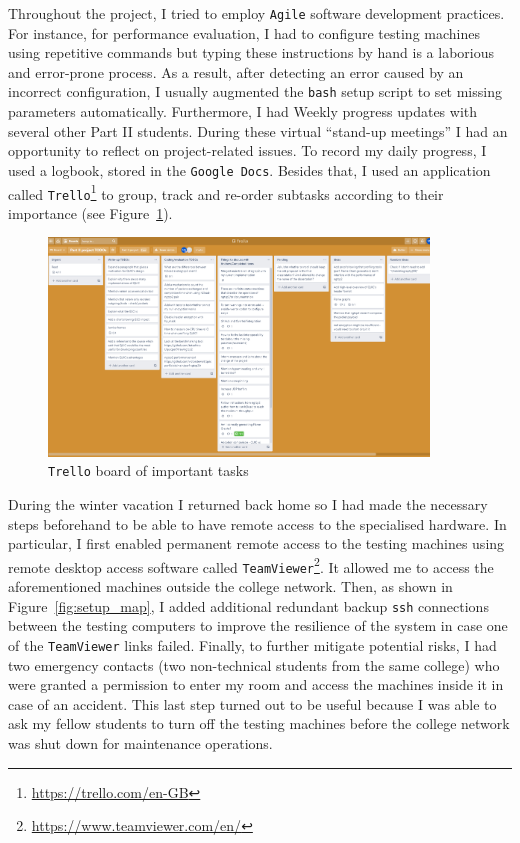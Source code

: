 \documentclass[12pt,a4paper,twoside,openright]{report}
\begin{document}
    
    Throughout the project, I tried to employ \texttt{Agile} software development practices.
    For instance, for performance evaluation, I had to configure testing machines using repetitive commands but typing these instructions by hand is a laborious and error-prone process.
    As a result, after detecting an error caused by an incorrect configuration, I usually augmented the \texttt{bash} setup script to set missing parameters automatically.
    Furthermore, I had Weekly progress updates with several other Part II students.
    During these virtual \enquote{stand-up meetings} I had an opportunity to reflect on project-related issues.
    To record my daily progress, I used a logbook, stored in the \texttt{Google Docs}.
    Besides that, I used an application called \texttt{Trello}\footnote{\url{https://trello.com/en-GB}} to group, track and re-order subtasks according to their importance (see Figure~\ref{fig:Trello_board}).

    \begin{figure}[ht]
    \centering
    \includegraphics[width=0.9\textwidth]{figs/Trello_board.PNG}
    \caption{\texttt{Trello} board of important tasks}
    \label{fig:Trello_board}
    \end{figure}
    
    During the winter vacation I returned back home so I had made the necessary steps beforehand to be able to have remote access to the specialised hardware.
    In particular, I first enabled permanent remote access to the testing machines using remote desktop access software called \texttt{TeamViewer}\footnote{\url{https://www.teamviewer.com/en/}}.
    It allowed me to access the aforementioned machines outside the college network.
    Then, as shown in Figure~\ref{fig:setup_map}, I added additional redundant backup \texttt{ssh} connections between the testing computers to improve the resilience of the system in case one of the \texttt{TeamViewer} links failed.
    Finally, to further mitigate potential risks, I had two emergency contacts (two non-technical students from the same college) who were granted a permission to enter my room and access the machines inside it in case of an accident.
    This last step turned out to be useful because I was able to ask my fellow students to turn off the testing machines before the college network was shut down for maintenance operations.
    
\end{document}
